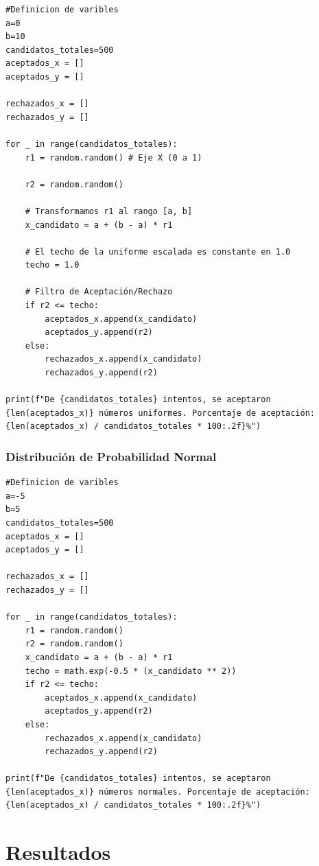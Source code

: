 \documentclass{article}
\begin{document}
\begin{verbatim}
#Definicion de varibles
a=0
b=10
candidatos_totales=500
aceptados_x = []
aceptados_y = []

rechazados_x = []
rechazados_y = []

for _ in range(candidatos_totales):
    r1 = random.random() # Eje X (0 a 1)
    
    r2 = random.random()
    
    # Transformamos r1 al rango [a, b]
    x_candidato = a + (b - a) * r1
    
    # El techo de la uniforme escalada es constante en 1.0
    techo = 1.0
    
    # Filtro de Aceptación/Rechazo
    if r2 <= techo:
        aceptados_x.append(x_candidato)
        aceptados_y.append(r2)
    else:
        rechazados_x.append(x_candidato)
        rechazados_y.append(r2)

print(f"De {candidatos_totales} intentos, se aceptaron
{len(aceptados_x)} números uniformes. Porcentaje de aceptación:
{len(aceptados_x) / candidatos_totales * 100:.2f}%")
\end{verbatim}

\subsubsection{Distribución de Probabilidad Normal}

\begin{verbatim}
#Definicion de varibles
a=-5
b=5
candidatos_totales=500
aceptados_x = []
aceptados_y = []

rechazados_x = []
rechazados_y = []

for _ in range(candidatos_totales):
    r1 = random.random()
    r2 = random.random()
    x_candidato = a + (b - a) * r1
    techo = math.exp(-0.5 * (x_candidato ** 2))
    if r2 <= techo:
        aceptados_x.append(x_candidato)
        aceptados_y.append(r2)
    else:
        rechazados_x.append(x_candidato)
        rechazados_y.append(r2)

print(f"De {candidatos_totales} intentos, se aceptaron
{len(aceptados_x)} números normales. Porcentaje de aceptación:
{len(aceptados_x) / candidatos_totales * 100:.2f}%")
\end{verbatim}



\section{Resultados}
\label{sec:resultados}
\end{document}
